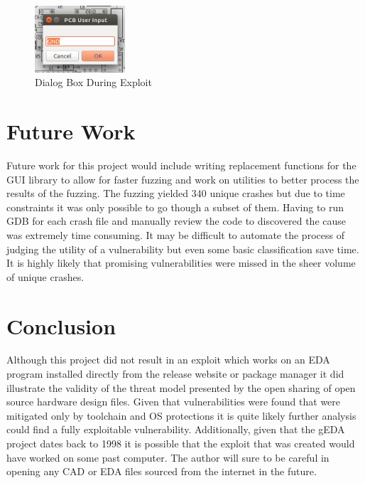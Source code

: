 \documentclass[12pt]{article}
\begin{document}
\begin{figure}
\centering
\includegraphics[width=0.3\textwidth]{images/exploit-gui-cropped.png}
\caption{Dialog Box During Exploit}
\label{fig:exploit-gui}
\end{figure}

\section{Future Work}
\label{S:6}
Future work for this project would include writing replacement functions for the GUI library to allow for faster fuzzing and work on utilities to better process the results of the fuzzing. The fuzzing yielded 340 unique crashes but due to time constraints it was only possible to go though a subset of them. Having to run GDB for each crash file and manually review the code to discovered the cause was extremely time consuming. It may be difficult to automate the process of judging the utility of a vulnerability but even some basic classification save time. It is highly likely that promising vulnerabilities were missed in the sheer volume of unique crashes. 

\section{Conclusion}
\label{S:7}
Although this project did not result in an exploit which works on an EDA program installed directly from the release website or package manager it did illustrate the validity of the threat model presented by the open sharing of open source hardware design files. Given that vulnerabilities were found that were mitigated only by toolchain and OS protections it is quite likely further analysis could find a fully exploitable vulnerability. Additionally, given that the gEDA project dates back to 1998 it is possible that the exploit that was created would have worked on some past computer. The author will sure to be careful in opening any CAD or EDA files sourced from the internet in the future. 
\end{document}

